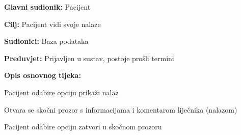 				\noindent {}
				\begin{packed_item}
					
					\item \textbf{Glavni sudionik: }Pacijent
					\item  \textbf{Cilj: }Pacijent vidi svoje nalaze
					\item  \textbf{Sudionici: }Baza podataka
					\item  \textbf{Preduvjet: }Prijavljen u sustav, postoje prošli termini
					\item  \textbf{Opis osnovnog tijeka: }
					
					\item[] \begin{packed_enum}
						
						\item Pacijent odabire opciju prikaži nalaz
						\item Otvara se skočni prozor s informacijama i komentarom liječnika (nalazom)
						\item Pacijent odabire opciju zatvori u skočnom prozoru
					\end{packed_enum}
				\end{packed_item}
				
